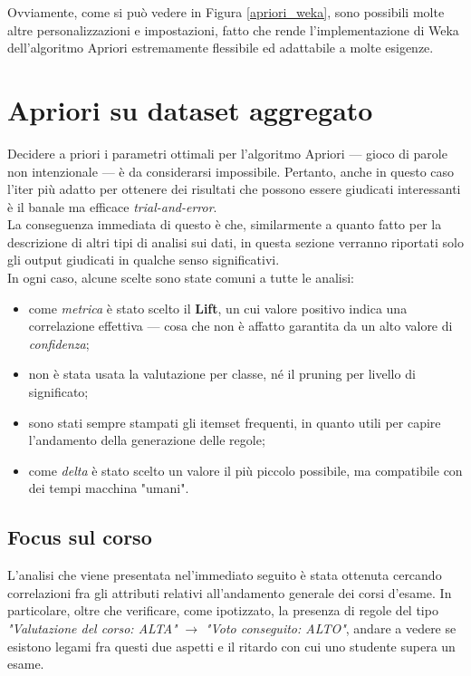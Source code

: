         Ovviamente, come si può vedere in Figura \ref{apriori_weka}, sono possibili molte altre personalizzazioni e impostazioni, fatto che rende l'implementazione di Weka dell'algoritmo Apriori estremamente flessibile ed adattabile a molte esigenze. \\
 
\section{Apriori su dataset aggregato}

    Decidere a priori i parametri ottimali per l'algoritmo Apriori --- \footnotesize{gioco di parole non intenzionale }\normalsize --- è da considerarsi impossibile. Pertanto, anche in questo caso l'iter più adatto per ottenere dei risultati che possono essere giudicati interessanti è il banale ma efficace \textit{trial-and-error}. \\

    La conseguenza immediata di questo è che, similarmente a quanto fatto per la descrizione di altri tipi di analisi sui dati, in questa sezione verranno riportati solo gli output giudicati in qualche senso significativi. \\

    In ogni caso, alcune scelte sono state comuni a tutte le analisi:

    \begin{itemize}
        \item come \textit{metrica} è stato scelto il \textbf{Lift}, un cui valore positivo indica una correlazione effettiva --- cosa che non è affatto garantita da un alto valore di \textit{confidenza};
        \item non è stata usata la valutazione per classe, né il pruning per livello di significato;
        \item sono stati sempre stampati gli itemset frequenti, in quanto utili per capire l'andamento della generazione delle regole;
        \item come \textit{delta} è stato scelto un valore il più piccolo possibile, ma compatibile con dei tempi macchina "umani".
    \end{itemize}

        \subsection{Focus sul corso}

            L'analisi che viene presentata nel'immediato seguito è stata ottenuta cercando correlazioni fra gli attributi relativi all'andamento generale dei corsi d'esame. In particolare, oltre che verificare, come ipotizzato, la presenza di regole del tipo \textit{"Valutazione del corso: ALTA"} $\rightarrow$ \textit{"Voto conseguito: ALTO"}, andare a vedere se esistono legami fra questi due aspetti e il ritardo con cui uno studente supera un esame. \\

